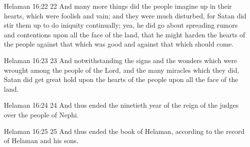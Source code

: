 Helaman 16:22
 22 And many more things did the people imagine up in their
hearts, which were foolish and vain; and they were much
disturbed, for Satan did stir them up to do iniquity continually;
yea, he did go about spreading rumors and contentions upon all
the face of the land, that he might harden the hearts of the
people against that which was good and against that which should
come.

Helaman 16:23
 23 And notwithstanding the signs and the wonders which were
wrought among the people of the Lord, and the many miracles which
they did, Satan did get great hold upon the hearts of the people
upon all the face of the land.

Helaman 16:24
 24 And thus ended the ninetieth year of the reign of the judges
over the people of Nephi.

Helaman 16:25
 25 And thus ended the book of Helaman, according to the record
of Helaman and his sons.




